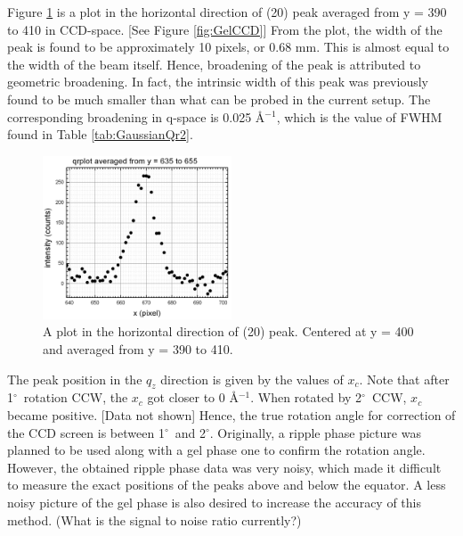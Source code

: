 \documentclass[letterpaper,12pt]{article}
\newcommand{\dg}{$^{\circ}$}%
\newcommand{\iang}{\AA$^{-1}$}%
\begin{document}
Figure \ref{fig:Gel20peakCCDqr} is a plot in the horizontal direction of (20) peak averaged from y = 390 to 410 in CCD-space. [See Figure \ref{fig:GelCCD}] From the plot, the width of the peak is found to be approximately 10 pixels, or 0.68 mm. This is almost equal to the width of the beam itself. Hence, broadening of the peak is attributed to geometric broadening. In fact, the intrinsic width of this peak was previously found to be much smaller than what can be probed in the current setup. The corresponding broadening in q-space is 0.025 \iang, which is the value of FWHM found in Table \ref{tab:GaussianQr2}.
\begin{figure}[htbp]
	\centering
	\includegraphics[width=0.5\textwidth]{gel20qr}
	\caption[A plot in the horizontal direction of (20) peak]{A plot in the horizontal direction of (20) peak. Centered at y = 400 and averaged from y = 390 to 410.}
	\label{fig:Gel20peakCCDqr}
\end{figure}

The peak position in the $q_z$ direction is given by the values of $x_c$. Note that after 1\dg\ rotation CCW, the $x_c$ got closer to 0 \iang.  When rotated by 2\dg\ CCW, $x_c$ became positive. [Data not shown] Hence, the true rotation angle for correction of the CCD screen is between 1\dg\ and 2\dg. Originally, a ripple phase picture was planned to be used along with a gel phase one to confirm the rotation angle. However, the obtained ripple phase data was very noisy, which made it difficult to measure the exact positions of the peaks above and below the equator. A less noisy picture of the gel phase is also desired to increase the accuracy of this method. (What is the signal to noise ratio currently?)
\end{document}
